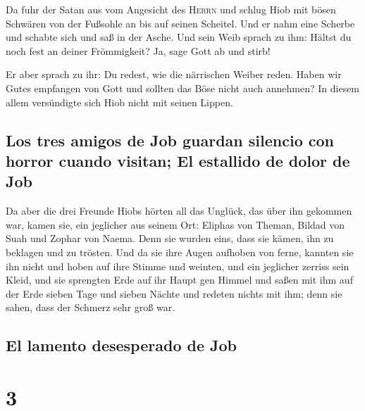  Da fuhr der Satan aus vom Angesicht des \textsc{Herrn}
und schlug Hiob mit bösen Schwären von der Fußsohle an bis auf seinen
Scheitel.  Und er nahm eine Scherbe und schabte sich und
saß in der Asche.  Und sein Weib sprach zu ihm: Hältst du
noch fest an deiner Frömmigkeit? Ja, sage Gott ab und stirb!

 Er aber sprach zu ihr: Du redest, wie die närrischen
Weiber reden. Haben wir Gutes empfangen von Gott und sollten das Böse
nicht auch annehmen? In diesem allem versündigte sich Hiob nicht mit
seinen Lippen.

\hypertarget{los-tres-amigos-de-job-guardan-silencio-con-horror-cuando-visitan-el-estallido-de-dolor-de-job}{%
\subsection{Los tres amigos de Job guardan silencio con horror cuando
visitan; El estallido de dolor de
Job}\label{los-tres-amigos-de-job-guardan-silencio-con-horror-cuando-visitan-el-estallido-de-dolor-de-job}}

 Da aber die drei Freunde Hiobs hörten all das Unglück,
das über ihn gekommen war, kamen sie, ein jeglicher aus seinem Ort:
Eliphas von Theman, Bildad von Suah und Zophar von Naema. Denn sie
wurden eins, dass sie kämen, ihn zu beklagen und zu trösten.
 Und da sie ihre Augen aufhoben von ferne, kannten sie
ihn nicht und hoben auf ihre Stimme und weinten, und ein jeglicher
zerriss sein Kleid, und sie sprengten Erde auf ihr Haupt gen Himmel
 und saßen mit ihm auf der Erde sieben Tage und sieben
Nächte und redeten nichts mit ihm; denn sie sahen, dass der Schmerz sehr
groß war.

\hypertarget{el-lamento-desesperado-de-job}{%
\subsection{El lamento desesperado de
Job}\label{el-lamento-desesperado-de-job}}

\hypertarget{section-2}{%
\section{3}\label{section-2}}

